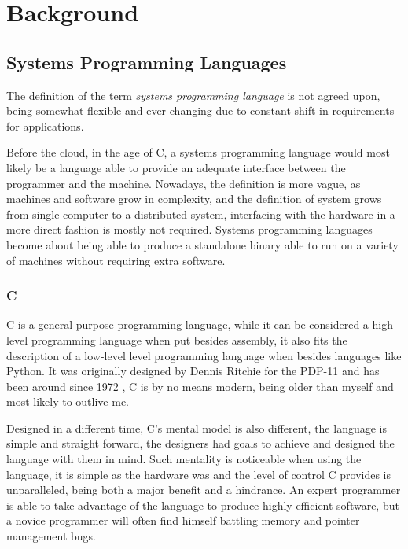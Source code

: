 \chapter{Background}\label{cha:background}

\section{Systems Programming Languages}\label{sec:systems-programming}

The definition of the term \emph{systems programming language} is not agreed upon,
being somewhat flexible and ever-changing due to constant shift in requirements for applications.

Before the cloud, in the age of C, a systems programming language would
most likely be a language able to provide an adequate interface between the programmer and the machine.
Nowadays, the definition is more vague, as machines and software grow in complexity,
and the definition of system grows from single computer to a distributed system,
interfacing with the hardware in a more direct fashion is mostly not required.
Systems programming languages become about being able to produce a standalone
binary able to run on a variety of machines without requiring extra software.

\subsection{C}

C is a general-purpose programming language, while it can be considered a high-level programming language
when put besides assembly, it also fits the description of a low-level level programming language when besides languages like Python.
It was originally designed by Dennis Ritchie for the PDP-11 and has been around since 1972 \autocite{Kernighan1988},
C is by no means modern, being older than myself and most likely to outlive me.

Designed in a different time, C's mental model is also different, the language is simple and straight forward,
the designers had goals to achieve and designed the language with them in mind.
Such mentality is noticeable when using the language,
it is simple as the hardware was and the level of control C provides is unparalleled,
being both a major benefit and a hindrance.
An expert programmer is able to take advantage of the language to produce highly-efficient software,
but a novice programmer will often find himself battling memory and pointer management bugs.

